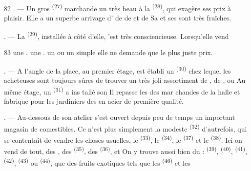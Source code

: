 \begin{VUpage}[84]{82}
. --- Un gros  \textsuperscript{(27)} marchande un très beau\nl
{} à la  \textsuperscript{(28)}, qui exagère\nl
ses prix à plaisir. Elle a un superbe arrivage d'\cc
{} de  de  et de  Sa\nl
{} et ses  sont très fraîches.

. --- La  \textsuperscript{(29)}, installée à\nl
côté d'elle, 'est très consciencieuse. Lorsqu'elle vend
\parplein
\end{VUpage}

\begin{VUpage}[85]{83}
\VUcontinue
une . une . un  ou un simple \nl
elle ne demande que le plus juste prix.

. --- A l'angle de la place, au premier étage, est\nl
établi un  \textsuperscript{(30)} chez lequel les\nl
acheteuses sont toujours sûres de trouver un très joli\nl
assortiment de , de ,  ou\nl
{} Au même étage, un  \textsuperscript{(31)} a ins\cc
tallé son  Il repasse les  des mar\cc
chandes de la halle et fabrique pour les jardiniers des\nl
{} en acier de première qualité.

. --- Au-dessous de son atelier s'est ouvert depuis\nl
peu de temps un important magasin de comestibles.\nl
Ce n'est plus simplement la modeste  \textsuperscript{(32)}\nl
d'autrefois, qui se contentait de vendre les choses\nl
usuelles, le  \textsuperscript{(33)}, le  \textsuperscript{(34)}, le \nl
{} \textsuperscript{(37)} et le  \textsuperscript{(38)}. Ici on vend de tout, des\nl
{}, des  \textsuperscript{(35)}, des  \textsuperscript{(36)},\nl
{} et  On\nl
y trouve aussi bien du  :  \textsuperscript{(39)},  \textsuperscript{(40)},\nl
{} \textsuperscript{(41)},  \textsuperscript{(42)},  \textsuperscript{(43)} ou\nl
{} \textsuperscript{(44)}, que des fruits exotiques tels que les \cc
{} \textsuperscript{(46)} et les 


\end{VUpage}
